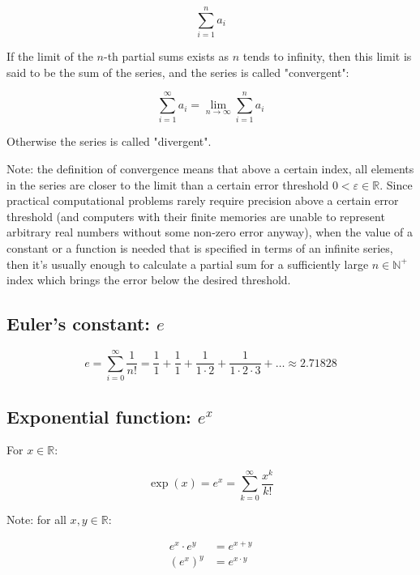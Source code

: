 \documentclass[titlepage]{article}
\begin{document}
        $$\sum_{i=1}^n a_i$$

        If the limit of the $n$-th partial sums exists as $n$ tends to infinity,
        then this limit is said to be the sum of the series, and the series is
        called "convergent":

        $$\sum_{i=1}^\infty a_i = \lim_{n \to \infty} \sum_{i=1}^n a_i$$

        Otherwise the series is called "divergent".

        Note: the definition of convergence means that above a certain index,
        all elements in the series are closer to the limit than a certain
        error threshold $0 < \varepsilon \in \mathbb{R}$. Since practical
        computational problems rarely require precision above a certain error
        threshold (and computers with their finite memories are unable to
        represent arbitrary real numbers without some non-zero error anyway),
        when the value of a constant or a function is needed that is specified
        in terms of an infinite series, then it's usually enough to calculate a
        partial sum for a sufficiently large $n \in \mathbb{N}^+$ index which
        brings the error below the desired threshold.

      \subsection{Euler's constant: $e$}

        $$
          e = \sum_{i=0}^\infty \frac{1}{n!}
            = \frac{1}{1}
              + \frac{1}{1}
              + \frac{1}{1 \cdot 2}
              + \frac{1}{1 \cdot 2 \cdot 3}
              + \ldots
            \approx 2.71828
        $$

      \subsection{Exponential function: $e^x$}

        For $x \in \mathbb{R}$:

        $$\exp(x) = e^x = \sum_{k=0}^\infty \frac{x^k}{k!}$$

        Note: for all $x, y \in \mathbb{R}$:

        \begin{align*}
          e^x \cdot e^y & = e^{x+y} \\
          \left( e^x \right)^y & = e^{x \cdot y}
        \end{align*}
\end{document}
